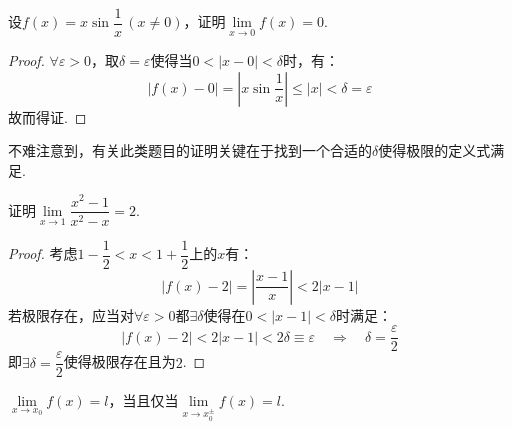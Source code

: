 \begin{question}
    设$f(x) = x \sin \dfrac{1}{x} \,(x\neq 0)$，证明$\lim\limits_{x\to 0}f(x)=0$.
\end{question}

\begin{proof}
    $\forall \varepsilon>0$，取$\delta=\varepsilon$使得当$0<|x-0|<\delta$时，有：
    \[|f(x) - 0| = \left|x\sin\frac{1}{x}\right| \leqslant |x| < \delta = \varepsilon\]
    故而得证.
\end{proof}
不难注意到，有关此类题目的证明关键在于找到一个合适的$\delta$使得极限的定义式满足.

\begin{question}
    证明$\lim\limits_{x\to 1}\dfrac{x^2-1}{x^2-x}=2$.
\end{question}

\begin{proof}
    考虑$1-\dfrac{1}{2}<x<1+\dfrac{1}{2}$上的$x$有：
    \[|f(x)-2| = \left|\frac{x-1}{x}\right| < 2|x-1|\]
    若极限存在，应当对$\forall \varepsilon>0$都$\exists \delta$使得在$0 < |x-1| < \delta$时满足：
    \[|f(x)-2|<2|x-1|<2\delta \equiv \varepsilon \quad\Rightarrow\quad \delta=\frac{\varepsilon}{2}\]
    即$\exists \delta = \dfrac{\varepsilon}{2}$使得极限存在且为$2$.
\end{proof}

\begin{theorem}
    $\lim\limits_{x\to x_0}f(x)=l$，当且仅当$\lim\limits_{x\to x_0^\pm}f(x)=l$.
\end{theorem}


